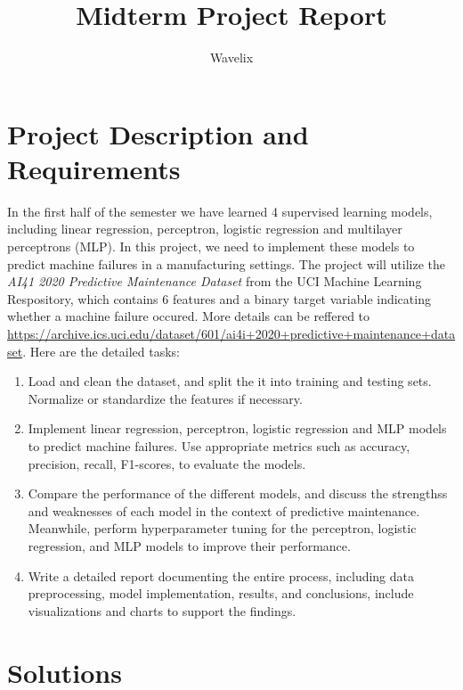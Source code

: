 \documentclass{article}
\title{\textbf{Midterm Project Report}}
\author{Wavelix}
\date{}
\begin{document}
\maketitle


\tableofcontents %

\section{Project Description and Requirements}

In the first half of the semester we have learned 4 supervised learning models, 
including linear regression, perceptron, logistic regression and multilayer 
perceptrons (MLP). In this project, we need to implement these models to predict machine
failures in a manufacturing settings. The project will utilize the \textit{AI41 2020 Predictive
Maintenance Dataset} from the UCI Machine Learning Respository, which contains 6 features
and a binary target variable indicating whether a machine failure occured. More details
can be reffered to \href{https://archive.ics.uci.edu/dataset/601/ai4i+2020+predictive+maintenance+dataset}{https://archive.ics.uci.edu/dataset/601/ai4i+2020+predictive+maintenance+dataset}.
Here are the detailed tasks:
\begin{enumerate}
    \item Load and clean the dataset, and split the it into training and testing sets.
    Normalize or standardize the features if necessary.
    \item Implement linear regression, perceptron, logistic regression and MLP models
    to predict machine failures. Use appropriate metrics such as accuracy, precision,
    recall, F1-scores, to evaluate the models.
    \item Compare the performance of the different models, and discuss the strengthss
    and weaknesses of each model in the context of predictive maintenance. Meanwhile,
    perform hyperparameter tuning for the perceptron, logistic regression, and MLP
    models to improve their performance.
    \item Write a detailed report documenting the entire process, including data 
    preprocessing, model implementation, results, and conclusions, include visualizations
    and charts to support the findings.
\end{enumerate}


\section{Solutions}
\end{document}
